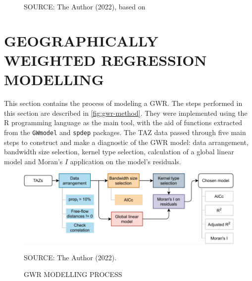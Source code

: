 \begin{figure}[!htbp]
\begin{subfigure}{0.5\textwidth}
    \end{subfigure}
    \label{fig:bsd_avi}
    \par SOURCE: The Author (2022), based on \textcite{IPPUC2018b,IPPUC2020a, IBGE2010}
\end{figure}


\section{GEOGRAPHICALLY WEIGHTED REGRESSION MODELLING} \label{gwm}









This section contains the process of modeling a GWR. The steps performed in this section are described in \autoref{fig:gwr-method}. They were implemented using the R programming language as the main tool, with the aid of functions extracted from the \verb|GWmodel| \cite{Gollini2013} and \verb|spdep| \cite{Bivand2013} packages. The TAZ data passed through five main steps to construct and make a diagnostic of the GWR model: data arrangement, bandwidth size selection, kernel type selection, calculation of a global linear model and Moran's $I$ application on the model's residuals. 

\begin{figure}[!htbp]
    \centering\footnotesize
    \captionsetup{font=footnotesize}
    \caption{GWR MODELLING PROCESS}
    \includegraphics{fig/gwr-method.pdf}
    \label{fig:gwr-method}
    \par SOURCE: The Author (2022).
\end{figure}

